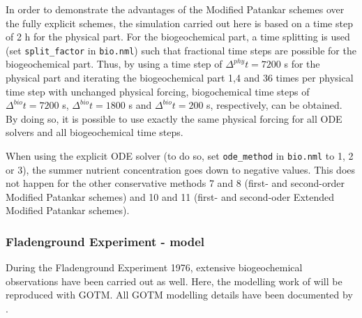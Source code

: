 In order to demonstrate the advantages of the 
Modified Patankar schemes over the fully explicit schemes, 
the simulation carried out here is based on
a time step of 2 h for the physical part. For the biogeochemical part,
a time splitting is used (set {\tt split\_factor}  in
{\tt bio.nml}) such that fractional time
steps are possible for the biogeochemical part.
Thus, by using a time step of $\Delta^{phy} t = 7200$ s for the
physical part and iterating the biogeochemical part 1,4 and 36 times
per physical time step with unchanged physical forcing,
biogochemical time steps of  $\Delta^{bio} t = 7200$ s,
$\Delta^{bio} t = 1800$ s and $\Delta^{bio} t = 200$ s,
respectively, can be obtained.
By doing so, it is possible to use exactly the same physical forcing
for all ODE solvers and all biogeochemical time steps.

When using the explicit ODE solver (to do so, set {\tt ode\_method}
in {\tt bio.nml} to 1, 2 or 3), the summer nutrient concentration
goes down to negative values.
This does not happen for the other conservative methods
7 and 8 (first- and second-order Modified Patankar schemes) and
10 and 11 (first- and second-oder Extended Modified Patankar
schemes). 


\subsubsection{Fladenground Experiment - \cite{Fashametal1990} model
}\label{flex_fasham}

During the Fladenground Experiment 1976, extensive biogeochemical
observations have been carried out as well. Here,
the modelling work of \cite{KuehnRadach1997} will be
reproduced with GOTM. All GOTM modelling details have been
documented by \cite{Burchardetal05}.

